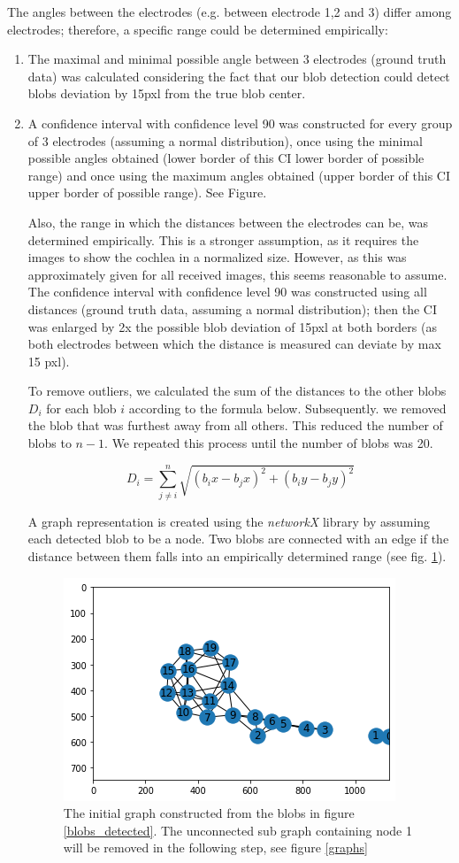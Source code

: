 \documentclass[a4paper, 11pt]{article}
\begin{document}
The angles between the electrodes (e.g. between electrode 1,2 and 3) differ among electrodes; therefore, a specific range could be determined empirically: 
\begin{enumerate}
\item The maximal and minimal possible angle between 3 electrodes (ground truth data) was calculated considering the fact that our blob detection could detect blobs deviation by 15pxl from the true blob center. 
\item A confidence interval with confidence level 90 was constructed for every group of 3 electrodes (assuming a normal distribution), once using the minimal possible angles obtained (lower border of this CI \rightarrow lower border of possible range) and once using the maximum angles obtained (upper border of this CI \rightarrow upper border of possible range). See Figure.

Also, the range in which the distances between the electrodes can be, was determined empirically. This is a stronger assumption, as it requires the images to show the cochlea in a normalized size. However, as this was approximately given for all received images, this seems reasonable to assume. The confidence interval with confidence level 90 was constructed using all distances (ground truth data, assuming a normal distribution); then the CI was enlarged by 2x the possible blob deviation of 15pxl at both borders (as both electrodes between which the distance is measured can deviate by max 15 pxl). 


To remove outliers, we calculated the sum of the distances to the other blobs $D_{i}$ for each blob $i$ according to the formula below. Subsequently. we removed the blob that was furthest away from all others. This reduced the number of blobs to $n-1$. We repeated this process until the number of blobs was 20.

$$D_{i}=\sum_{j\neq i}^{n} \sqrt{(b_ix-b_jx)^2+(b_iy-b_jy)^2}$$

A graph representation is created using the \emph{networkX} library \cite{networkx} by assuming each detected blob to be a node. Two blobs are connected with an edge if the distance between them falls into an empirically determined range (see fig. \ref{network_raw}). %

\begin{figure}[ht]
	\centering
  \includegraphics[width=.5\textwidth]{network_raw.png}
	\caption{The initial graph constructed from the blobs in figure \ref{blobs_detected}. The unconnected sub graph containing node 1 will be removed in the following step, see figure \ref{graphs}}
	\label{network_raw}
\end{figure}


\end{enumerate}
\end{document}

